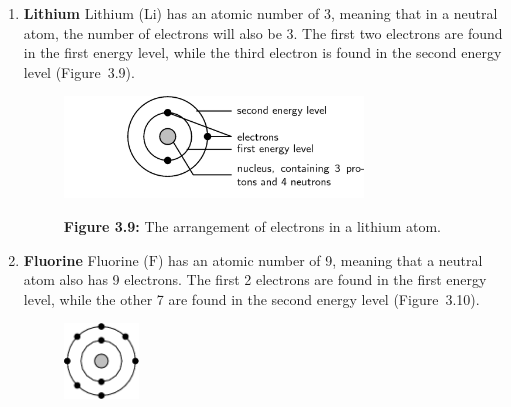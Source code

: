         \label{m38741*id259361}\begin{enumerate}[noitemsep, label=\textbf{\arabic*}. ] 
            \label{m38741*uid86}\item \textbf{Lithium}
Lithium (Li) has an atomic number of 3, meaning that in a neutral atom, the number of electrons will also be 3. The first two electrons are found in the first energy level, while the third electron is found in the second energy level (Figure~3.9).
    \setcounter{subfigure}{0}
	\begin{figure}[H] %
    \begin{center}
    \label{m38741*uid87!!!underscore!!!media}\label{m38741*uid87!!!underscore!!!printimage}\includegraphics[width=300px]{col11305.imgs/m38741_CG10C3_005.png} %
      \vspace{2pt}
    \vspace{\rubberspace}\par \begin{cnxcaption}
	  \small \textbf{Figure 3.9: }The arrangement of electrons in a lithium atom.
	\end{cnxcaption}
    \vspace{.1in}
    \end{center}
 \end{figure}       \label{m38741*uid88}\item \textbf{Fluorine}
Fluorine ($\mathrm{F}$) has an atomic number of 9, meaning that a neutral atom also has 9 electrons. The first 2 electrons are found in the first energy level, while the other 7 are found in the second energy level (Figure~3.10).
    \setcounter{subfigure}{0}
	\begin{figure}[H] %
    \begin{center}
    \label{m38741*uid89!!!underscore!!!media}\label{m38741*uid89!!!underscore!!!printimage}\includegraphics[width=2cm]{col11305.imgs/m38741_CG10C3_006.png} %

\end{center}
\end{figure}
\end{enumerate}
